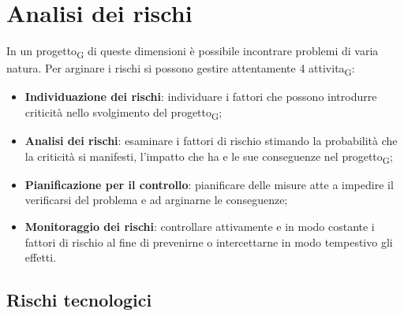 \section{Analisi dei rischi}

In un progetto\textsubscript{G} di queste dimensioni è possibile incontrare problemi di varia natura. Per arginare i rischi si possono gestire attentamente 4 attivita\textsubscript{G}:

\begin{itemize}
	\item \textbf{Individuazione dei rischi}: individuare i fattori che possono introdurre criticità nello svolgimento del progetto\textsubscript{G};
	\item \textbf{Analisi dei rischi}: esaminare i fattori di rischio stimando la probabilità che la criticità si manifesti, l'impatto che ha e le sue conseguenze nel progetto\textsubscript{G};
	\item \textbf{Pianificazione per il controllo}: pianificare delle misure atte a impedire il verificarsi del problema e ad arginarne le conseguenze;
	\item \textbf{Monitoraggio dei rischi}: controllare attivamente e in modo costante i fattori di rischio al fine di prevenirne o intercettarne in modo tempestivo gli effetti.
\end{itemize}


\subsection{Rischi tecnologici}




